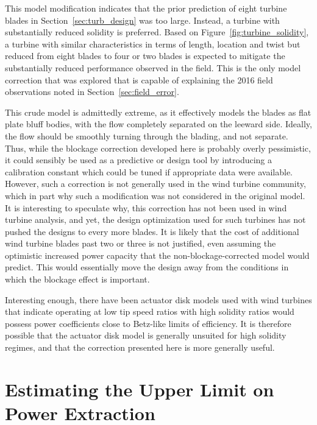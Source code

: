 This model modification indicates that the prior prediction of eight
turbine blades in Section~\ref{sec:turb_design} was too large. Instead,
a turbine with substantially reduced solidity is preferred. Based on
Figure~\ref{fig:turbine_solidity}, a turbine with similar
characteristics in terms of length, location and twist but reduced from
eight blades to four or two blades is expected to mitigate the
substantially reduced performance observed in the field. 
This is the only model correction that was explored that is
capable of explaining the 2016 field observations noted in
Section~\ref{sec:field_error}.  

This crude model is admittedly extreme, as it effectively models the
blades as flat plate bluff bodies, with the flow completely
separated on the leeward side. Ideally, the flow should be smoothly
turning through the blading, and not separate. Thus, while the blockage
correction developed here is probably overly pessimistic, it could
sensibly be used as a predictive or design tool by introducing a
calibration constant which could be tuned if appropriate data were
available. However, such a correction is not generally used in the wind
turbine community, which in part why such a modification was not
considered in the original model. It is interesting to speculate why,
this correction has not been used in wind turbine analysis, and yet, the
design optimization used for such turbines has not pushed the designs to
every more blades. It is likely that the cost of additional wind turbine
blades past two or three is not justified, even assuming the optimistic
increased power capacity that the non-blockage-corrected model would
predict. This would essentially move the design away from the conditions 
in which the blockage effect is important. 

Interesting enough, there have been actuator disk models used with wind
turbines that indicate operating at low tip speed ratios with high
solidity ratios would possess power coefficients close to Betz-like
limits of efficiency\cite{WE:WE118}. It is therefore possible that the
actuator disk model is generally unsuited for high solidity regimes, and
that the correction presented here is more generally useful. 


\section{Estimating the Upper Limit on Power Extraction}
\label{sec:peak_estimate}

